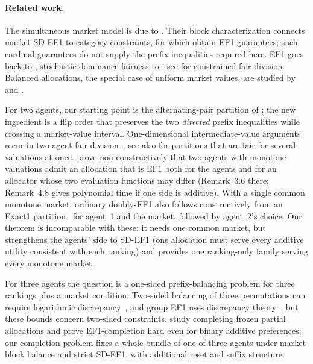 \documentclass[sigconf,anonymous]{aamas}
\begin{document}
\paragraph{Related work.}
The simultaneous market model is due to \citet{barman2025market}. Their block characterization connects market SD-EF1 to category constraints, for which \citet{biswas2018cardinality} obtain EF1 guarantees; such cardinal guarantees do not supply the prefix inequalities required here. EF1 goes back to \citet{lipton2004ef1,budish2011}, stochastic-dominance fairness to \citet{aziz2015ordinal}; see \citet{suksompong2021constraints} for constrained fair division. Balanced allocations, the special case of uniform market values, are studied by \citet{dupre2026balanced} and \citet{cookson2026balanced}.

For two agents, our starting point is the alternating-pair partition of \citet[Lemma~4.1]{kyropoulou2020group}; the new ingredient is a flip order that preserves the two \emph{directed} prefix inequalities while crossing a market-value interval. One-dimensional intermediate-value arguments recur in two-agent fair division~\citep{kyropoulou2020group,dupre2026balanced}; see also \citet{goldberg2022halving,dupre2026necklace} for partitions that are fair for several valuations at once. \citet{bu2023allocator} prove non-constructively that two agents with monotone valuations admit an allocation that is EF1 both for the agents and for an allocator whose two evaluation functions may differ (Remark~3.6 there; Remark~4.8 gives polynomial time if one side is additive). With a single common monotone market, ordinary doubly-EF1 also follows constructively from an Exact1 partition~\citep[Appendix~A]{goldberg2022halving} for agent~1 and the market, followed by agent~2's choice. Our theorem is incomparable with these: it needs one common market, but strengthens the agents' side to SD-EF1 (one allocation must serve every additive utility consistent with each ranking) and provides one ranking-only family serving every monotone market.

For three agents the question is a one-sided prefix-balancing problem for three rankings plus a market condition. Two-sided balancing of three permutations can require logarithmic discrepancy~\citep{newman2012beck}, and group EF1 uses discrepancy theory~\citep{manurangsi2022groups}, but these bounds concern two-sided constraints. \citet{prakash2025completion} study completing frozen partial allocations and prove EF1-completion hard even for binary additive preferences; our completion problem fixes a whole bundle of one of three agents under market-block balance and strict SD-EF1, with additional reset and suffix structure.
\end{document}
